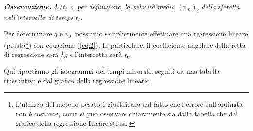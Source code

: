 \documentclass{article}
\begin{document}
\emph{
    \textbf{Osservazione.} $d_i/t_i$ è, per definizione, la velocità
    media $\left(v_m\right)_i$ della sferetta nell'intervallo di tempo $t_i$.
}

Per determinare $g$ e $v_0$, possiamo semplicemente effettuare una regressione
lineare (pesata\footnote{
    L'utilizzo del metodo pesato è giustificato dal fatto che l'errore
    sull'ordinata non è costante, come si può osservare chiaramente sia
    dalla tabella che dal grafico della regressione lineare stessa.
}) con equazione (\ref{eq:2}). In particolare, il coefficiente angolare della
retta di regressione sarà $\frac{1}{2} g$ e l'intercetta sarà $v_0$.

Qui riportiamo gli istogrammi dei tempi misurati, seguiti da una tabella
riassuntiva e dal grafico della regressione lineare:
\end{document}
